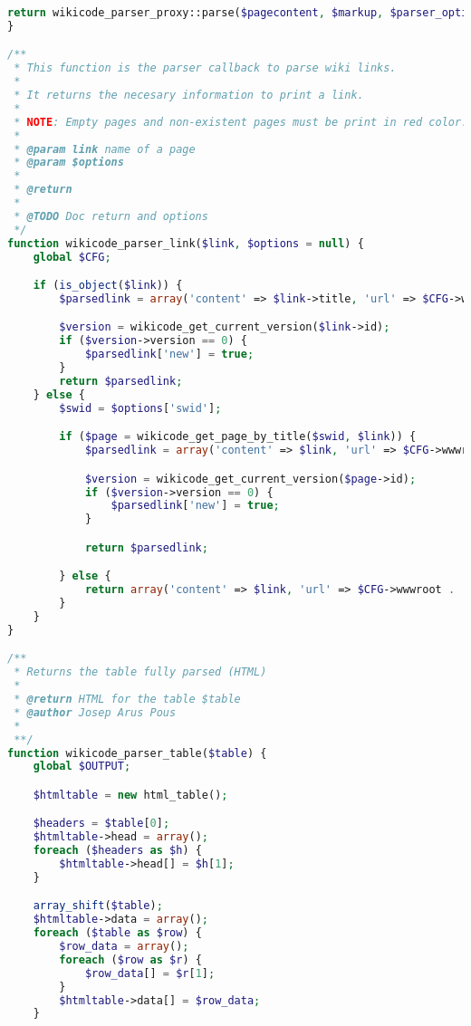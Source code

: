 \begin{lstlisting}[language=PHP]
    return wikicode_parser_proxy::parse($pagecontent, $markup, $parser_options);
}

/**
 * This function is the parser callback to parse wiki links.
 *
 * It returns the necesary information to print a link.
 *
 * NOTE: Empty pages and non-existent pages must be print in red color.
 *
 * @param link name of a page
 * @param $options
 *
 * @return
 *
 * @TODO Doc return and options
 */
function wikicode_parser_link($link, $options = null) {
    global $CFG;

    if (is_object($link)) {
        $parsedlink = array('content' => $link->title, 'url' => $CFG->wwwroot . '/mod/wikicode/view.php?pageid=' . $link->id, 'new' => false, 'link_info' => array('link' => $link->title, 'pageid' => $link->id, 'new' => false));

        $version = wikicode_get_current_version($link->id);
        if ($version->version == 0) {
            $parsedlink['new'] = true;
        }
        return $parsedlink;
    } else {
        $swid = $options['swid'];

        if ($page = wikicode_get_page_by_title($swid, $link)) {
            $parsedlink = array('content' => $link, 'url' => $CFG->wwwroot . '/mod/wikicode/view.php?pageid=' . $page->id, 'new' => false, 'link_info' => array('link' => $link, 'pageid' => $page->id, 'new' => false));

            $version = wikicode_get_current_version($page->id);
            if ($version->version == 0) {
                $parsedlink['new'] = true;
            }

            return $parsedlink;

        } else {
            return array('content' => $link, 'url' => $CFG->wwwroot . '/mod/wikicode/create.php?swid=' . $swid . '&amp;title=' . urlencode($link) . '&amp;action=new', 'new' => true, 'link_info' => array('link' => $link, 'new' => true, 'pageid' => 0));
        }
    }
}

/**
 * Returns the table fully parsed (HTML)
 *
 * @return HTML for the table $table
 * @author Josep Arus Pous
 *
 **/
function wikicode_parser_table($table) {
    global $OUTPUT;

    $htmltable = new html_table();

    $headers = $table[0];
    $htmltable->head = array();
    foreach ($headers as $h) {
        $htmltable->head[] = $h[1];
    }

    array_shift($table);
    $htmltable->data = array();
    foreach ($table as $row) {
        $row_data = array();
        foreach ($row as $r) {
            $row_data[] = $r[1];
        }
        $htmltable->data[] = $row_data;
    }


\end{lstlisting}
